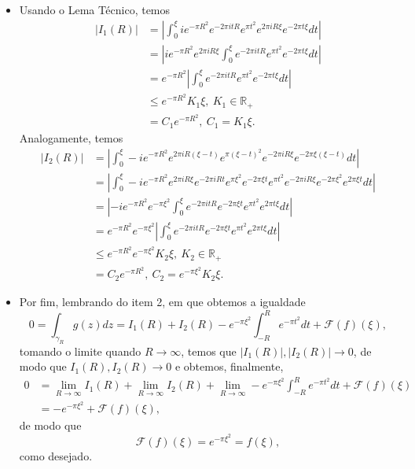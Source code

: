 \documentclass[12pt,a4paper]{article}
\begin{document}
\begin{enumerate}
\begin{itemize}
			\item Usando o Lema Técnico, temos
			\begin{align*}
			|I_1(R)| &= \left| \int_{0}^{\xi}ie^{-\pi R^2}e^{-2\pi itR}e^{\pi t^2}e^{2\pi iR\xi}e^{-2\pi t\xi} dt \right| \\
			&= \left| ie^{-\pi R^2}e^{2\pi iR\xi}\int_{0}^{\xi}e^{-2\pi itR}e^{\pi t^2}e^{-2\pi t\xi} dt \right| \\
			&= e^{-\pi R^2} \left|\int_{0}^{\xi}e^{-2\pi itR}e^{\pi t^2}e^{-2\pi t\xi} dt \right| \\
			&\leq e^{-\pi R^2}K_1\xi, \ K_1\in\mathbb{R}_{+} \\
			&= C_1e^{-\pi R^2}, \ C_1 = K_1\xi.
			\end{align*}
			Analogamente, temos
			\begin{align*}
			|I_2(R)| &= \left| \int_{0}^{\xi}-ie^{-\pi R^2}e^{2\pi iR(\xi -t)}e^{\pi (\xi -t)^2}e^{-2\pi iR\xi}e^{-2\pi \xi(\xi - t)} dt \right| \\
			&= \left| \int_{0}^{\xi}-ie^{-\pi R^2}e^{2\pi iR\xi}e^{-2\pi iRt}e^{\pi \xi^2}e^{-2\pi\xi t}e^{\pi t^2}e^{-2\pi iR\xi}e^{-2\pi \xi^2}e^{2\pi\xi t} dt \right| \\
			&= \left| -ie^{-\pi R^2}e^{-\pi\xi^2}\int_{0}^{\xi}e^{-2\pi itR}e^{-2\pi\xi t}e^{\pi t^2}e^{2\pi t\xi} dt \right| \\
			&= e^{-\pi R^2}e^{-\pi\xi^2} \left|\int_{0}^{\xi}e^{-2\pi itR}e^{-2\pi\xi t}e^{\pi t^2}e^{2\pi t\xi} dt \right| \\
			&\leq e^{-\pi R^2}e^{-\pi\xi^2}K_2\xi, \ K_2\in\mathbb{R}_{+} \\
			&= C_2e^{-\pi R^2}, \ C_2 = e^{-\pi\xi^2}K_2\xi. 
			\end{align*}
			
			\item Por fim, lembrando do item 2, em que obtemos a igualdade
			$$
			0 = \int_{\gamma_R}g(z)dz = I_1(R) + I_2(R) - e^{-\pi\xi^2}\int_{-R}^{R}e^{-\pi t^2}dt + \mathcal{F}(f)(\xi),
			$$
			tomando o limite quando $R\to\infty$, temos que $|I_1(R)|,|I_2(R)|\to 0$, de modo que $I_1(R), I_2(R)\to 0$ e obtemos, finalmente,
			\begin{align*}
			0 &= \lim\limits_{R\to\infty} I_1(R) + \lim\limits_{R\to\infty} I_2(R) + \lim\limits_{R\to\infty} -e^{-\pi\xi^2}\int_{-R}^{R}e^{-\pi t^2}dt + \mathcal{F}(f)(\xi) \\
			&= -e^{-\pi\xi^2} + \mathcal{F}(f)(\xi),
			\end{align*}
			de modo que 
			$$
			\mathcal{F}(f)(\xi) = e^{-\pi\xi^2} = f(\xi),
			$$
			como desejado.
		\end{itemize}
		

\end{enumerate}
\end{document}
